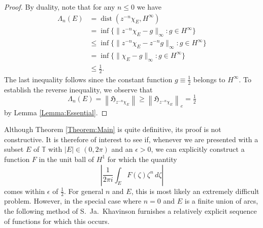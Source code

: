 \documentclass[11pt,reqno]{amsart}
\numberwithin{equation}{section}
\theoremstyle{plain}
\theoremstyle{definition}
\begin{document}
	\begin{proof}
		
		
		
	
		By duality, note that for any $n \leq 0$ we have
		\begin{align*}
			\Lambda_{n}(E) & = {\operatorname{dist}}(z^{-n} \chi_E, H^{\infty})\\
			&  = \inf\{\|z^{-n} \chi_{E} - g\|_{\infty}: g \in H^{\infty}\}\\
			& \leq  \inf \{\|z^{- n} \chi_{E} - z^{- n} g\|_{\infty}: g \in H^{\infty}\}\\ 
			& =   \inf \{\|\chi_{E} - g\|_{\infty}: g \in H^{\infty}\}\\ 
			& \leq \tfrac{1}{2}.
		\end{align*}
		The last inequality follows since the constant function $g \equiv \frac{1}{2}$ belongs to $H^{\infty}$.
		To establish the reverse inequality, we observe that
		\begin{equation*}
			\Lambda_{n}(E) = {\left\| { {\mathfrak{H}}_{z^{-n} \chi_E}} \right\|} \geq {\left\| { {\mathfrak{H}}_{z^{-n} \chi_E}} \right\|}_e = \tfrac{1}{2}
		\end{equation*}
		by Lemma \ref{Lemma:Essential}.
	\end{proof}

	Although Theorem \ref{Theorem:Main} is quite definitive, its proof is not constructive.  It is therefore of
	interest to see if, whenever we are presented with a subset $E$ of ${\mathbb{T}}$ with $|E| \in (0, 2 \pi)$ and an $\epsilon > 0$, we can explicitly construct a function $F$ in the unit ball of $H^1$ for 
	which the quantity
	\begin{equation*}
		\left|  \frac{1}{2\pi i } \int_E F(\zeta)\zeta^n \,d\zeta  \right|
	\end{equation*}
	comes within $\epsilon$ of $\frac{1}{2}$.
	For general $n$ and $E$, this is most likely an extremely difficult problem.  However,
	in the special case where $n=0$ and $E$ is a finite union of arcs, the following method of S.~Ja.~Khavinson  \cite[p.~18]{Kha-Sr}
	furnishes a relatively explicit sequence of functions for which this occurs.
\end{document}
